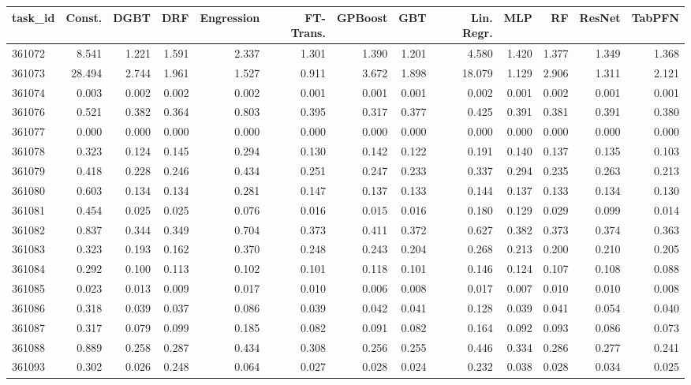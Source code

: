 \begin{tabular}{lrrrrrrrrrrrr}
\toprule
task\_id & Const. & DGBT & DRF & Engression & FT-Trans. & GPBoost & GBT & Lin. Regr. & MLP & RF & ResNet & TabPFN \\
\midrule
361072 & 8.541 & 1.221 & 1.591 & 2.337 & 1.301 & 1.390 & 1.201 & 4.580 & 1.420 & 1.377 & 1.349 & 1.368 \\
361073 & 28.494 & 2.744 & 1.961 & 1.527 & 0.911 & 3.672 & 1.898 & 18.079 & 1.129 & 2.906 & 1.311 & 2.121 \\
361074 & 0.003 & 0.002 & 0.002 & 0.002 & 0.001 & 0.001 & 0.001 & 0.002 & 0.001 & 0.002 & 0.001 & 0.001 \\
361076 & 0.521 & 0.382 & 0.364 & 0.803 & 0.395 & 0.317 & 0.377 & 0.425 & 0.391 & 0.381 & 0.391 & 0.380 \\
361077 & 0.000 & 0.000 & 0.000 & 0.000 & 0.000 & 0.000 & 0.000 & 0.000 & 0.000 & 0.000 & 0.000 & 0.000 \\
361078 & 0.323 & 0.124 & 0.145 & 0.294 & 0.130 & 0.142 & 0.122 & 0.191 & 0.140 & 0.137 & 0.135 & 0.103 \\
361079 & 0.418 & 0.228 & 0.246 & 0.434 & 0.251 & 0.247 & 0.233 & 0.337 & 0.294 & 0.235 & 0.263 & 0.213 \\
361080 & 0.603 & 0.134 & 0.134 & 0.281 & 0.147 & 0.137 & 0.133 & 0.144 & 0.137 & 0.133 & 0.134 & 0.130 \\
361081 & 0.454 & 0.025 & 0.025 & 0.076 & 0.016 & 0.015 & 0.016 & 0.180 & 0.129 & 0.029 & 0.099 & 0.014 \\
361082 & 0.837 & 0.344 & 0.349 & 0.704 & 0.373 & 0.411 & 0.372 & 0.627 & 0.382 & 0.373 & 0.374 & 0.363 \\
361083 & 0.323 & 0.193 & 0.162 & 0.370 & 0.248 & 0.243 & 0.204 & 0.268 & 0.213 & 0.200 & 0.210 & 0.205 \\
361084 & 0.292 & 0.100 & 0.113 & 0.102 & 0.101 & 0.118 & 0.101 & 0.146 & 0.124 & 0.107 & 0.108 & 0.088 \\
361085 & 0.023 & 0.013 & 0.009 & 0.017 & 0.010 & 0.006 & 0.008 & 0.017 & 0.007 & 0.010 & 0.010 & 0.008 \\
361086 & 0.318 & 0.039 & 0.037 & 0.086 & 0.039 & 0.042 & 0.041 & 0.128 & 0.039 & 0.041 & 0.054 & 0.040 \\
361087 & 0.317 & 0.079 & 0.099 & 0.185 & 0.082 & 0.091 & 0.082 & 0.164 & 0.092 & 0.093 & 0.086 & 0.073 \\
361088 & 0.889 & 0.258 & 0.287 & 0.434 & 0.308 & 0.256 & 0.255 & 0.446 & 0.334 & 0.286 & 0.277 & 0.241 \\
361093 & 0.302 & 0.026 & 0.248 & 0.064 & 0.027 & 0.028 & 0.024 & 0.232 & 0.038 & 0.028 & 0.034 & 0.025 \\

\end{tabular}
